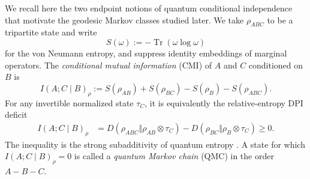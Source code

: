 \documentclass[11pt]{article}
\theoremstyle{remark}
\newcommand{\1}{\mathbbm{1}}
\begin{document}
We recall here the two endpoint notions of quantum conditional
independence that motivate the geodesic Markov classes studied
later.  We take $\rho_{ABC}$ to be a tripartite state and write
\begin{equation}
 S(\omega):=-\operatorname{Tr}(\omega\log\omega)
\end{equation}
for the von Neumann entropy, and suppress identity embeddings of
marginal operators.  The \emph{conditional mutual information} (CMI)
of $A$ and $C$ conditioned on $B$ is
\begin{equation}
 I(A;C\mid B)_\rho
 :=S(\rho_{AB})+S(\rho_{BC})-S(\rho_B)-S(\rho_{ABC}).
 \label{rw:eq:ordinary-cmi}
\end{equation}
For any invertible normalized state $\tau_C$, it is equivalently the
relative-entropy DPI deficit
\begin{equation}
 \begin{aligned}
 I(A;C\mid B)_\rho
 &=D(\rho_{ABC}\Vert\rho_{AB}\otimes\tau_C)
   -D(\rho_{BC}\Vert\rho_B\otimes\tau_C)
 \geq0.
 \end{aligned}
 \label{rw:eq:cmi-as-DPI-deficit}
\end{equation}
The inequality is the strong subadditivity of quantum entropy
\cite{lieb1973strong}.  A state for which
$I(A;C\mid B)_\rho=0$ is called a \emph{quantum Markov chain}
(QMC) in the order $A-B-C$.
\end{document}
